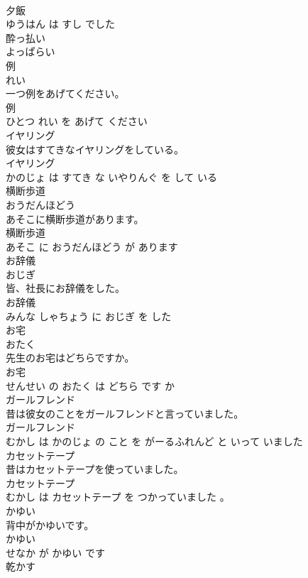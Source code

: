 \documentclass[8pt]{extreport}
\begin{document}
\begin{CJK}{UTF8}{min}
\\	夕飯 
\\	ゆうはん は すし でした			
\\	酔っ払い	
\\	よっぱらい			
\\	例	
\\	れい			
\\	一つ例をあげてください。	
\\	例 
\\	ひとつ れい を あげて ください			
\\	イヤリング	
\\	彼女はすてきなイヤリングをしている。	
\\	イヤリング 
\\	かのじょ は すてき な いやりんぐ を して いる			
\\	横断歩道	
\\	おうだんほどう			
\\	あそこに横断歩道があります。	
\\	横断歩道 
\\	あそこ に おうだんほどう が あります			
\\	お辞儀	
\\	おじぎ			
\\	皆、社長にお辞儀をした。	
\\	お辞儀 
\\	みんな しゃちょう に おじぎ を した			
\\	お宅	
\\	おたく			
\\	先生のお宅はどちらですか。	
\\	お宅 
\\	せんせい の おたく は どちら です か			
\\	ガールフレンド	
\\	昔は彼女のことをガールフレンドと言っていました。	
\\	ガールフレンド 
\\	むかし は かのじょ の こと を がーるふれんど と いって いました			
\\	カセットテープ	
\\	昔はカセットテープを使っていました。	
\\	カセットテープ 
\\	むかし は カセットテープ を つかっていました 。			
\\	かゆい	
\\	背中がかゆいです。	
\\	かゆい 
\\	せなか が かゆい です			
\\	乾かす	

\end{CJK}
\end{document}
